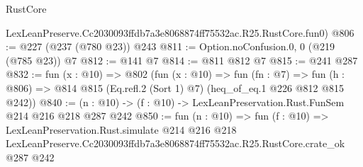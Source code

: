 \begin{lexlean}{RustCore}
\begin{coremodule}
    LexLeanPreserve.Cc2030093ffdb7a3e8068874ff75532ac.R25.RustCore.fun0)
@806 := @227 (@237 (@780 @23)) @243
@811 := Option.noConfusion.{0, 0} (@219 (@785 @23)) @7
@812 := @141 @7
@814 := @811 @812 @7
@815 := @241 @287
@832 := fun (x : @10) =>
  @802
    (fun (x : @10) =>
    fun (fn : @7) =>
    fun (h : @806) => @814 @815 (Eq.refl.{2} (Sort 1) @7) (heq_of_eq.{1} @226 @812 @815 @242))
@840 := (n : @10) -> (f : @10) -> LexLeanPreservation.Rust.FunSem @214 @216 @218 @287 @242
@850 := fun (n : @10) =>
  fun (f : @10) =>
  LexLeanPreservation.Rust.simulate
    @214
    @216
    @218
    LexLeanPreserve.Cc2030093ffdb7a3e8068874ff75532ac.R25.RustCore.crate_ok
    @287
    @242
\end{coremodule}
\end{lexlean}
